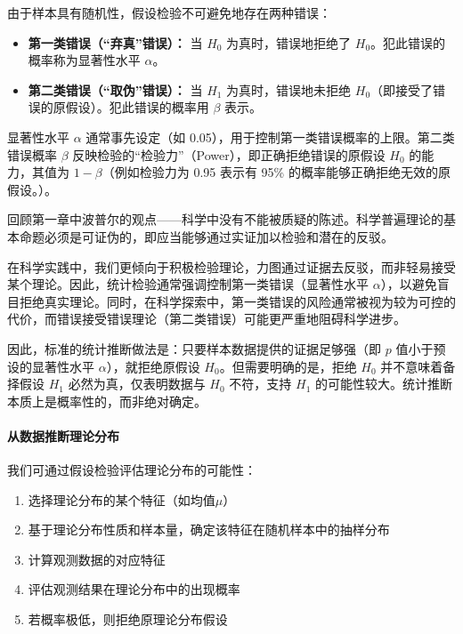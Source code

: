 由于样本具有随机性，假设检验不可避免地存在两种错误：

\begin{itemize}
	\item \textbf{第一类错误（``弃真''错误）：} 当 \(H_0\) 为真时，错误地拒绝了 \(H_0\)。犯此错误的概率称为显著性水平 \(\alpha\)。
	\item \textbf{第二类错误（``取伪''错误）：} 当 \(H_1\) 为真时，错误地未拒绝 \(H_0\)（即接受了错误的原假设）。犯此错误的概率用 \(\beta\) 表示。
\end{itemize}

显著性水平 \(\alpha\) 通常事先设定（如 0.05），用于控制第一类错误概率的上限。第二类错误概率 \(\beta\) 反映检验的``检验力''（Power），即正确拒绝错误的原假设 \(H_0\) 的能力，其值为 \(1-\beta\)（例如检验力为 0.95 表示有 95\% 的概率能够正确拒绝无效的原假设。）。

回顾第一章中波普尔的观点——科学中没有不能被质疑的陈述。科学普遍理论的基本命题必须是可证伪的，即应当能够通过实证加以检验和潜在的反驳。

在科学实践中，我们更倾向于积极检验理论，力图通过证据去反驳，而非轻易接受某个理论。因此，统计检验通常强调控制第一类错误（显著性水平 \(\alpha\)），以避免盲目拒绝真实理论。同时，在科学探索中，第一类错误的风险通常被视为较为可控的代价，而错误接受错误理论（第二类错误）可能更严重地阻碍科学进步。

因此，标准的统计推断做法是：只要样本数据提供的证据足够强（即 \(p\) 值小于预设的显著性水平 \(\alpha\)），就拒绝原假设 \(H_0\)。但需要明确的是，拒绝 \(H_0\) 并不意味着备择假设 \(H_1\) 必然为真，仅表明数据与 \(H_0\) 不符，支持 \(H_1\) 的可能性较大。统计推断本质上是概率性的，而非绝对确定。

\paragraph*{从数据推断理论分布}
我们可通过假设检验评估理论分布的可能性：
\begin{enumerate}
	\item 选择理论分布的某个特征（如均值$\mu$）
	\item 基于理论分布性质和样本量，确定该特征在随机样本中的抽样分布
	\item 计算观测数据的对应特征
	\item 评估观测结果在理论分布中的出现概率
	\item 若概率极低，则拒绝原理论分布假设
\end{enumerate}
	
\vspace{0.8em} %


